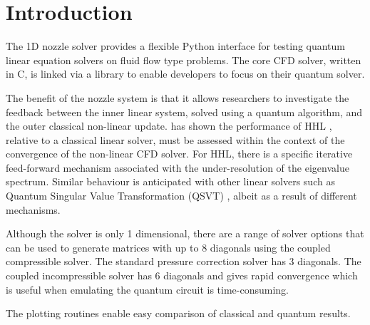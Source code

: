 %
\section{Introduction}

The 1D nozzle solver provides a flexible Python interface for testing quantum linear equation
solvers on fluid flow type problems.
The core CFD solver, written in C, is linked via a library to enable developers to focus on their
quantum solver.

The benefit of the nozzle system is that it allows researchers to investigate the feedback between the
inner linear system, solved using a quantum algorithm, and the outer classical non-linear update.
\cite{lapworth2022implicit} has shown the performance of HHL \cite{harrow2009quantum}, relative to a classical linear
solver, must be assessed within the context of the convergence of the non-linear CFD solver.
For HHL, there is a specific iterative feed-forward mechanism associated with the 
under-resolution of the eigenvalue spectrum.
Similar behaviour is anticipated with other linear solvers such as 
Quantum Singular Value Transformation (QSVT)
\cite{martyn2021grand, gilyen2019quantum, dong2021efficient}
, albeit as a result of different mechanisms.

Although the solver is only 1 dimensional, there are a range of solver options that can be
used to generate matrices with up to 8 diagonals using the coupled compressible solver. The standard
pressure correction solver has 3 diagonals. The coupled incompressible solver has 6 diagonals and
gives rapid convergence which is useful when emulating the quantum circuit is time-consuming.

The plotting routines enable easy comparison of classical and quantum results.



